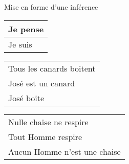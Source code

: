 \begin{frame}
	
	\begin{description}[labelindent=6pt,style=multiline,leftmargin=1.3in]
		 \setlength\itemsep{1.4em}


		\item[définition] Mise en forme d'une inférence\pause

	\item[Exemples] 
\begin{tabular}{l}
Je pense\\\hline Je suis\\ 
\end{tabular}

\pause
\item[] \begin{tabular}{l}
Tous les canards boitent\\José est un canard\\\hline José boite\\ 
\end{tabular}

\pause
\item[] \begin{tabular}{l}
Nulle chaise ne respire\\Tout Homme respire\\\hline Aucun Homme n'est une chaise\\ 
\end{tabular}

	\end{description}

\end{frame}



\begin{frame}
	
\end{frame}

